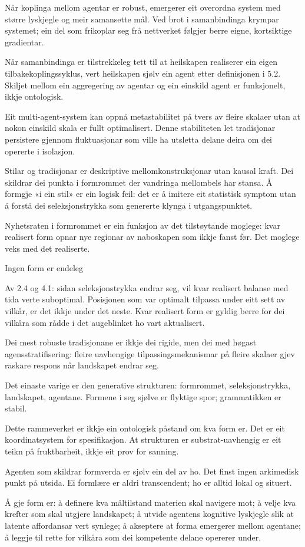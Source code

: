 \documentclass[10pt,oneside]{book}
\newlength{\propnumwidth}
\newlength{\propnumgap}
\newcommand{\prop}[3]{%
  \par\addvspace{6pt}%
  \noindent\llap{\makebox[\propnumwidth][l]{\textbf{#1}\textsuperscript{\textit{#2}}}\hspace{\propnumgap}}%
  #3\par%
  \addvspace{2pt}%
}
\begin{document}
\prop{6.4}{o}{Når koplinga mellom agentar er robust, emergerer eit overordna system med større lyskjegle og meir samansette mål. Ved brot i samanbindinga krympar systemet; ein del som frikoplar seg frå nettverket følgjer berre eigne, kortsiktige gradientar.}
\prop{6.41}{t}{Når samanbindinga er tilstrekkeleg tett til at heilskapen realiserer ein eigen tilbakekoplingssyklus, vert heilskapen sjølv ein agent etter definisjonen i 5.2. Skiljet mellom ein aggregering av agentar og ein einskild agent er funksjonelt, ikkje ontologisk.}
\prop{6.42}{o}{Eit multi-agent-system kan oppnå metastabilitet på tvers av fleire skalaer utan at nokon einskild skala er fullt optimalisert. Denne stabiliteten let tradisjonar persistere gjennom fluktuasjonar som ville ha utsletta delane deira om dei opererte i isolasjon.}
\prop{6.5}{t}{Stilar og tradisjonar er deskriptive mellomkonstruksjonar utan kausal kraft. Dei skildrar dei punkta i formrommet der vandringa mellombels har stansa. Å formgje «i ein stil» er ein logisk feil: det er å imitere eit statistisk symptom utan å forstå dei seleksjonstrykka som genererte klynga i utgangspunktet.}
\prop{6.6}{o}{Nyhetsraten i formrommet er ein funksjon av det tilstøytande moglege: kvar realisert form opnar nye regionar av naboskapen som ikkje fanst før. Det moglege veks med det realiserte.}
\clearpage
{}
\prop{7}{}{Ingen form er endeleg}
\prop{7.1}{t}{Av 2.4 og 4.1: sidan seleksjonstrykka endrar seg, vil kvar realisert balanse med tida verte suboptimal. Posisjonen som var optimalt tilpassa under eitt sett av vilkår, er det ikkje under det neste. Kvar realisert form er gyldig berre for dei vilkåra som rådde i det augeblinket ho vart aktualisert.}
\prop{7.2}{t}{Dei mest robuste tradisjonane er ikkje dei rigide, men dei med høgast agensstratifisering: fleire uavhengige tilpassingsmekanismar på fleire skalaer gjev raskare respons når landskapet endrar seg.}
\prop{7.3}{o}{Det einaste varige er den generative strukturen: formrommet, seleksjonstrykka, landskapet, agentane. Formene i seg sjølve er flyktige spor; grammatikken er stabil.}
\prop{7.4}{o}{Dette rammeverket er ikkje ein ontologisk påstand om kva form er. Det er eit koordinatsystem for spesifikasjon. At strukturen er substrat-uavhengig er eit teikn på fruktbarheit, ikkje eit prov for sanning.}
\prop{7.5}{o}{Agenten som skildrar formverda er sjølv ein del av ho. Det finst ingen arkimedisk punkt på utsida. Ei formlære er aldri transcendent; ho er alltid lokal og situert.}
\prop{7.6}{o}{Å gje form er: å definere kva måltilstand materien skal navigere mot; å velje kva krefter som skal utgjere landskapet; å utvide agentens kognitive lyskjegle slik at latente affordansar vert synlege; å akseptere at forma emergerer mellom agentane; å leggje til rette for vilkåra som dei kompetente delane opererer under.}
\end{document}
